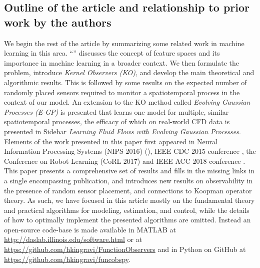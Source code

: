 \subsection*{Outline of the article and relationship to prior work by the authors}
 We begin the rest of the article by summarizing some related work in machine learning in this area.  ``'' discusses the concept of feature spaces and its importance in machine learning in a broader context. We then formulate the problem, introduce \emph{Kernel Observers (KO)}, and develop the main theoretical and algorithmic results.
This is followed by some results on the expected number of randomly placed sensors required to monitor a spatiotemporal process in the context of our model. An extension to the KO method called \emph{Evolving Gaussian Processes (E-GP)} is presented that learns one model for multiple, similar spatiotemporal processes, the efficacy of which on real-world CFD data is presented in Sidebar \emph{Learning Fluid Flows with Evolving Gaussian Processes}.
Elements of the work presented in this paper first appeared in Neural Information Processing Systems (NIPS 2016) (\cite{Kingravi16_NIPS,whitman2016NIPSworkshop}), IEEE CDC 2015 conference \cite{Kingravi:2015a}, the Conference on Robot Learning (CoRL 2017) \cite{whitman2017learning} and IEEE ACC 2018 conference \cite{Maske18_ACC}.  This paper presents a comprehensive set of results and fills in the missing links in a single encompassing publication, and introduces new results on observability in the presence of random sensor placement, and connections to Koopman operator theory. As such, we have focused in this article mostly on the fundamental theory and practical algorithms for modeling, estimation, and control, while the details of how to optimally implement the presented algorithms are omitted. Instead an open-source code-base is made available in MATLAB at \url{http://daslab.illinois.edu/software.html} or at \url{https://github.com/hkingravi/FunctionObservers} and in Python on GitHub at \url{https://github.com/hkingravi/funcobspy}.

